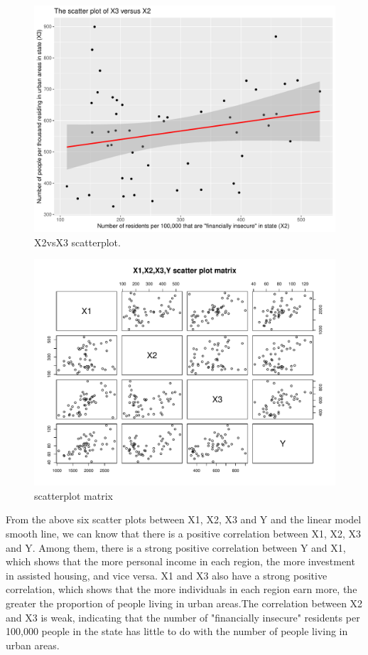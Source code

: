 \documentclass[12pt,letterpaper]{article}
\begin{document}
\begin{itemize}
\begin{figure}[h!]
\end{figure}
\begin{figure}[h!]\centering
	\caption{\footnotesize X2vsX3 scatterplot.}
	\label{fig:plot_X2_vs_X3}
	\includegraphics[width=.75\textwidth]{X2_vs_X3_scatterplot.pdf}
\end{figure}
\begin{figure}[h!]\centering
	\caption{\footnotesize  scatterplot matrix}
	\label{fig:matrix_X1_X2_X3_X4_Y}
	\includegraphics[width=.75\textwidth]{scatterplot_matrix.pdf}
\end{figure}
\vspace{10cm}
 From the above six scatter plots between X1, X2, X3 and Y and the linear model smooth line, we can know that there is a positive correlation between X1, X2, X3 and Y. Among them, there is a strong positive correlation between Y and X1, which shows that the more personal income in each region, the more investment in assisted housing, and vice versa. X1 and X3 also have a strong positive correlation, which shows that the more individuals in each region earn more, the greater the proportion of people living in urban areas.The correlation between X2 and X3 is weak, indicating that the number of "financially insecure" residents per 100,000 people in the state has little to do with the number of people living in urban areas. \\
\end{itemize}
\end{document}
